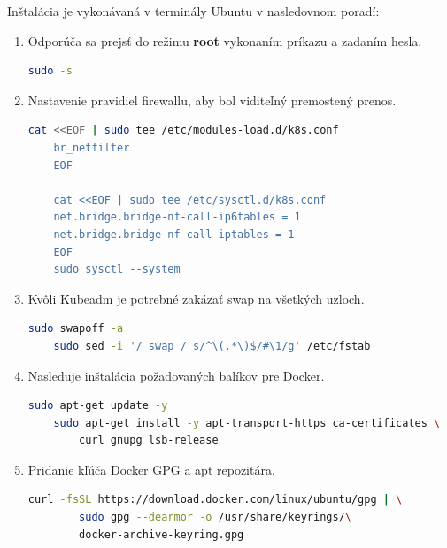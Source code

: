 Inštalácia je vykonávaná v terminály Ubuntu v nasledovnom poradí:
\begin{enumerate}
    \item{\noindent Odporúča sa prejsť do režimu \textbf{root} vykonaním príkazu a zadaním hesla.
\begin{lstlisting}[language=Bash,basicstyle=\footnotesize]
    sudo -s
    \end{lstlisting}}
\item{\noindent Nastavenie pravidiel firewallu, aby bol viditeľný premostený prenos.
\begin{lstlisting}[language=Bash,basicstyle=\footnotesize]
    cat <<EOF | sudo tee /etc/modules-load.d/k8s.conf
    br_netfilter
    EOF

    cat <<EOF | sudo tee /etc/sysctl.d/k8s.conf
    net.bridge.bridge-nf-call-ip6tables = 1
    net.bridge.bridge-nf-call-iptables = 1
    EOF
    sudo sysctl --system
    \end{lstlisting}}
    \item{\noindent Kvôli Kubeadm je potrebné zakázať swap na všetkých uzloch.
\begin{lstlisting}[language=Bash,basicstyle=\footnotesize]
    sudo swapoff -a
    sudo sed -i '/ swap / s/^\(.*\)$/#\1/g' /etc/fstab
    \end{lstlisting}}
    \item{\noindent Nasleduje inštalácia požadovaných balíkov pre Docker.
\begin{lstlisting}[language=Bash,basicstyle=\footnotesize]
    sudo apt-get update -y
    sudo apt-get install -y apt-transport-https ca-certificates \
        curl gnupg lsb-release
    \end{lstlisting}}
    \item{\noindent Pridanie kľúča Docker GPG a apt repozitára.
\begin{lstlisting}[language=Bash,basicstyle=\footnotesize]
    curl -fsSL https://download.docker.com/linux/ubuntu/gpg | \
        sudo gpg --dearmor -o /usr/share/keyrings/\
        docker-archive-keyring.gpg


\end{lstlisting}}
\end{enumerate}
